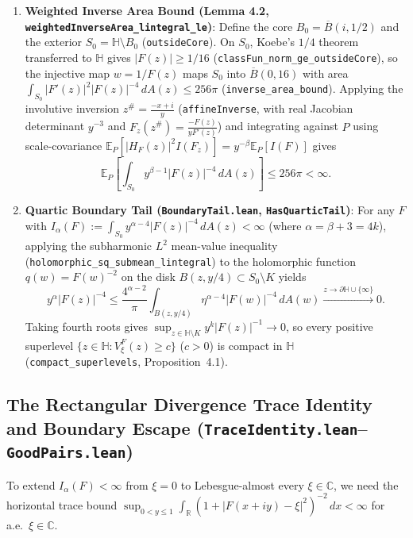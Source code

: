 \documentclass[11pt,reqno]{amsart}
\theoremstyle{definition}
\newcommand{\C}{\mathbb{C}}
\newcommand{\R}{\mathbb{R}}
\newcommand{\uhp}{\mathbb{H}}
\newcommand{\E}{\mathbb{E}}
\begin{document}
\begin{enumerate}[label=(\arabic*)]
\item \textbf{Weighted Inverse Area Bound (Lemma 4.2, \texttt{weightedInverseArea\_lintegral\_le})}:
Define the core $B_0 = \overline{B}(i, 1/2)$ and the exterior $S_0 = \uhp \setminus B_0$ (\texttt{outsideCore}). On $S_0$, Koebe's $1/4$ theorem transferred to $\uhp$ gives $|F(z)| \ge 1/16$ (\texttt{classFun\_norm\_ge\_outsideCore}), so the injective map $w = 1/F(z)$ maps $S_0$ into $\overline{B}(0,16)$ with area $\int_{S_0} |F'(z)|^2 |F(z)|^{-4}\,dA(z) \le 256\pi$ (\texttt{inverse\_area\_bound}).
Applying the involutive inversion $z^\# = \frac{-x+i}{y}$ (\texttt{affineInverse}, with real Jacobian determinant $y^{-3}$ and $F_z(z^\#) = \frac{-F(z)}{y F'(z)}$) and integrating against $P$ using scale-covariance $\E_P[|H_F(z)|^2 I(F_z)] = y^{-\beta}\E_P[I(F)]$ gives
\[
\E_P\left[\int_{S_0} y^{\beta-1}|F(z)|^{-4}\,dA(z)\right] \le 256\pi < \infty.
\]

\item \textbf{Quartic Boundary Tail (\texttt{BoundaryTail.lean}, \texttt{HasQuarticTail})}:
For any $F$ with $I_\alpha(F) := \int_{S_0} y^{\alpha-4}|F(z)|^{-4}\,dA(z) < \infty$ (where $\alpha = \beta+3 = 4k$), applying the subharmonic $L^2$ mean-value inequality (\texttt{holomorphic\_sq\_submean\_lintegral}) to the holomorphic function $q(w) = F(w)^{-2}$ on the disk $B(z, y/4) \subset S_0 \setminus K$ yields
\[
y^\alpha |F(z)|^{-4} \le \frac{4^{\alpha-2}}{\pi} \int_{B(z,y/4)} \eta^{\alpha-4}|F(w)|^{-4}\,dA(w) \xrightarrow{z \to \partial\uhp \cup \{\infty\}} 0.
\]
Taking fourth roots gives $\sup_{z \in \uhp \setminus K} y^k |F(z)|^{-1} \to 0$, so every positive superlevel $\{z \in \uhp : V_\xi^F(z) \ge c\}$ ($c > 0$) is compact in $\uhp$ (\texttt{compact\_superlevels}, Proposition~4.1).
\end{enumerate}

\subsection{The Rectangular Divergence Trace Identity and Boundary Escape (\texttt{TraceIdentity.lean}--\texttt{GoodPairs.lean})}

To extend $I_\alpha(F) < \infty$ from $\xi = 0$ to Lebesgue-almost every $\xi \in \C$, we need the horizontal trace bound $\sup_{0 < y \le 1} \int_\R (1 + |F(x+iy)-\xi|^2)^{-2}\,dx < \infty$ for a.e.\ $\xi \in \C$.
\end{document}
